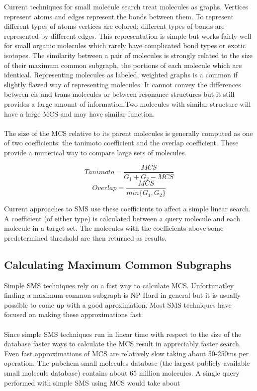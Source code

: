\documentclass[DIV=calc, paper=a4, fontsize=12pt, twocolumn]{scrartcl}	 %
\begin{document}
Current techniques for small molecule search treat molecules as graphs. Vertices represent atoms and edges represent the bonds between them. To represent different types of atoms vertices are colored; different types of bonds are represented by different edges. This representation is simple but works fairly well for small organic molecules which rarely have complicated bond types or exotic isotopes. 
The similarity between a pair of molecules is strongly related to the size of their maximum common subgraph, the portions of each molecule which are identical. Representing molecules as labeled, weighted graphs is a common if slightly flawed way of representing molecules. It cannot convey the differences between cis and trans molecules or between resonance structures but it still provides a large amount of information.Two molecules with similar structure will have a large MCS and may have similar function.
\\\\
The size of the MCS relative to its parent molecules is generally computed as one of two coefficients: the tanimoto coefficient and the overlap coefficient. These provide a numerical way to compare large sets of molecules.

\[Tanimoto  = \frac{MCS}{G_1 + G_2 - MCS}\]
\[Overlap = \frac{MCS}{min\{G_1, G_2\}}\]

Current approaches to SMS use these coefficients to affect a simple linear search. A coefficient (of either type) is calculated between a query molecule and each molecule in a target set. The molecules with the coefficients above some predetermined threshold are then returned as results.


\subsection*{Calculating Maximum Common Subgraphs}

Simple SMS techniques rely on a fast way to calculate MCS. Unfortunatley finding a maximum common subgraph is NP-Hard in general but it is usually possible to come up with a good aproximation. Most SMS techniques have focused on making these approximations fast. 
\\\\
Since simple SMS techniques run in linear time with respect to the size of the database faster ways to calculate the MCS result in appreciably faster search. Even fast approximations of MCS are relatively slow taking about 50-250ms per operation. The pubchem small molecules database (the largest publicly available small molecule database) contains about 65 million molecules. A  single query performed with simple SMS using MCS would take about
\end{document}
